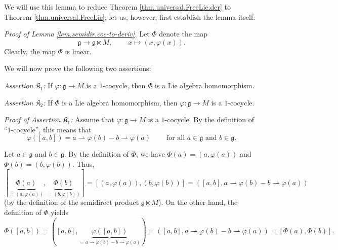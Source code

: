 \documentclass[etingof-lie.tex]{subfiles}
\begin{document}
\begin{verlong}
We will use this lemma to reduce Theorem \ref{thm.universal.FreeLie.der} to
Theorem \ref{thm.universal.FreeLie}; let us, however, first establish the
lemma itself:

\textit{Proof of Lemma \ref{lem.semidir.coc-to-deriv}.} Let $\Phi$ denote the
map
\[
\mathfrak{g}\rightarrow\mathfrak{g}\ltimes M,\ \ \ \ \ \ \ \ \ \ x\mapsto
\left(  x,\varphi\left(  x\right)  \right)  .
\]
Clearly, the map $\Phi$ is linear.

We will now prove the following two assertions:

\textit{Assertion }$\mathfrak{K}_{1}$\textit{:} If $\varphi:\mathfrak{g}%
\rightarrow M$ is a $1$-cocycle, then $\Phi$ is a Lie algebra homomorphism.

\textit{Assertion }$\mathfrak{K}_{2}$\textit{:} If $\Phi$ is a Lie algebra
homomorphism, then $\varphi:\mathfrak{g}\rightarrow M$ is a $1$-cocycle.

\textit{Proof of Assertion }$\mathfrak{K}_{1}$\textit{:} Assume that
$\varphi:\mathfrak{g}\rightarrow M$ is a $1$-cocycle. By the definition of
``$1$-cocycle'', this means that
\[
\varphi\left(  \left[  a,b\right]  \right)  =a\rightharpoonup\varphi\left(
b\right)  -b\rightharpoonup\varphi\left(  a\right)
\ \ \ \ \ \ \ \ \ \ \text{for all }a\in\mathfrak{g}\text{ and }b\in
\mathfrak{g}.
\]


Let $a\in\mathfrak{g}$ and $b\in\mathfrak{g}$. By the definition of $\Phi$, we
have $\Phi\left(  a\right)  =\left(  a,\varphi\left(  a\right)  \right)  $ and
$\Phi\left(  b\right)  =\left(  b,\varphi\left(  b\right)  \right)  $. Thus,%
\[
\left[  \underbrace{\Phi\left(  a\right)  }_{=\left(  a,\varphi\left(
a\right)  \right)  },\underbrace{\Phi\left(  b\right)  }_{=\left(
b,\varphi\left(  b\right)  \right)  }\right]  =\left[  \left(  a,\varphi
\left(  a\right)  \right)  ,\left(  b,\varphi\left(  b\right)  \right)
\right]  =\left(  \left[  a,b\right]  ,a\rightharpoonup\varphi\left(
b\right)  -b\rightharpoonup\varphi\left(  a\right)  \right)
\]
(by the definition of the semidirect product $\mathfrak{g}\ltimes M$). On the
other hand, the definition of $\Phi$ yields
\[
\Phi\left(  \left[  a,b\right]  \right)  =\left(  \left[  a,b\right]
,\underbrace{\varphi\left(  \left[  a,b\right]  \right)  }_{=a\rightharpoonup
\varphi\left(  b\right)  -b\rightharpoonup\varphi\left(  a\right)  }\right)
=\left(  \left[  a,b\right]  ,a\rightharpoonup\varphi\left(  b\right)
-b\rightharpoonup\varphi\left(  a\right)  \right)  =\left[  \Phi\left(
a\right)  ,\Phi\left(  b\right)  \right]  .
\]



\end{verlong}
\end{document}

